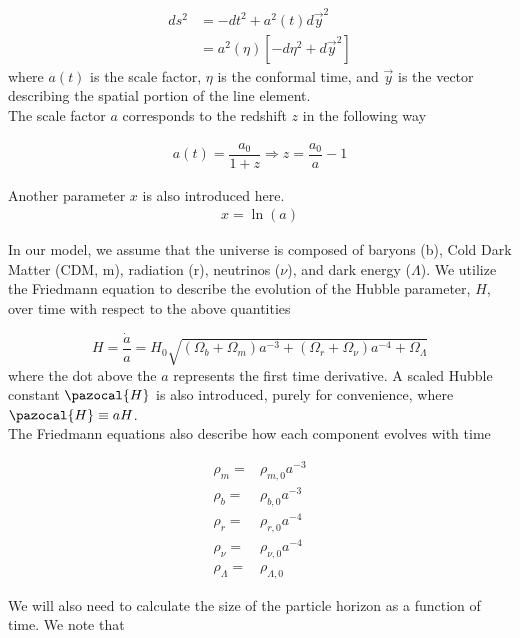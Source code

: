 \documentclass[a4paper]{article}
\begin{document}
\begin{align}\label{FRW}
ds^2 &= -dt^2 + a^2(t)d\vec{y}^2\\
     &= a^2(\eta)[-d{\eta}^2 + d\vec{y}^2]
\end{align}
where $a(t)$ is the scale factor, $\eta$ is the conformal time, and $\vec{y}$ is the vector describing the spatial portion of the line element.\\

The scale factor $a$ corresponds to the redshift $z$ in the following way

\begin{align}
a(t) = \dfrac{a_0}{1+z} \Rightarrow z = \dfrac{a_0}{a} -1
\end{align}

Another parameter $x$ is also introduced here.
\begin{align}
x = \ln(a)
\end{align}

In our model, we assume that the universe is composed of baryons (b), Cold Dark Matter (CDM, m), radiation (r), neutrinos ($\nu$), and dark energy ($\Lambda$). We utilize the Friedmann equation to describe the evolution of the Hubble parameter, $H$, over time with respect to the above quantities

\begin{equation}\label{Hubble}
H = \dfrac{\dot{a}}{a} = H_0\sqrt{(\Omega_b + \Omega_m)a^{-3} + (\Omega_r + \Omega_{\nu})a^{-4} + \Omega_{\Lambda}}
\end{equation}
where the dot above the $a$ represents the first time derivative. A scaled Hubble constant $\pazocal{H}$ is also introduced, purely for convenience, where $\pazocal{H} \equiv aH$. \\


The Friedmann equations also describe how each component evolves with time

\begin{equation} \label{eq:rho}
\begin{aligned}
\rho_m =& \rho_{m,0}a^{-3}\\
\rho_b =& \rho_{b,0}a^{-3}\\
\rho_r =& \rho_{r,0}a^{-4}\\
\rho_{\nu} =& \rho_{\nu,0}a^{-4}\\
\rho_{\Lambda} =& \rho_{\Lambda,0}
\end{aligned}
\end{equation}

We will also need to calculate the size of the particle horizon as a function of time. We note that
\end{document}
